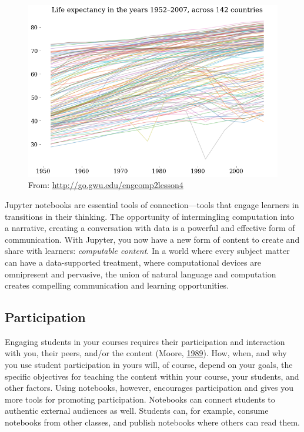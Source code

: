 \documentclass[]{book}
\begin{document}
\begin{figure}
\centering
\includegraphics{images/engcomp2lesson4-life-expectancy.png}
\caption{From: \url{http://go.gwu.edu/engcomp2lesson4}}
\end{figure}

Jupyter notebooks are essential tools of connection---tools that engage
learners in transitions in their thinking. The opportunity of intermingling
computation into a narrative, creating a conversation with data is a powerful
and effective form of communication. With Jupyter, you now have a new form of
content to create and share with learners: \emph{computable content}. In a world
where every subject matter can have a data-supported treatment, where
computational devices are omnipresent and pervasive, the union of natural
language and computation creates compelling communication and learning
opportunities.

\hypertarget{participation}{%
\subsection{Participation}\label{participation}}

Engaging students in your courses requires their participation and interaction
with you, their peers, and/or the content (Moore, \protect\hyperlink{ref-moore1989three}{1989}). How, when, and
why you use student participation in yours will, of course, depend on your
goals, the specific objectives for teaching the content within your course, your
students, and other factors. Using notebooks, however, encourages participation
and gives you more tools for promoting participation. Notebooks can connect
students to authentic external audiences as well. Students can, for example,
consume notebooks from other classes, and publish notebooks where others can
read them.
\end{document}
